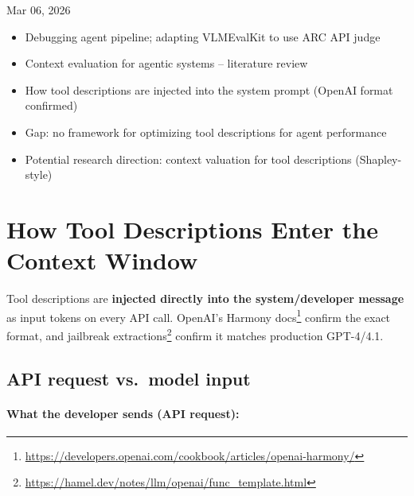 \meetingheader
    {Mar 06, 2026}
    {}
    {}
    {\begin{itemize}
        \item Debugging agent pipeline; adapting VLMEvalKit to use ARC API judge
        \item Context evaluation for agentic systems -- literature review
        \item How tool descriptions are injected into the system prompt (OpenAI format confirmed)
        \item Gap: no framework for optimizing tool descriptions for agent performance
        \item Potential research direction: context valuation for tool descriptions (Shapley-style)
    \end{itemize}}
    {}



\section{How Tool Descriptions Enter the Context Window}

Tool descriptions are \textbf{injected directly into the system/developer message} as input tokens on every API call.
OpenAI's Harmony docs\footnote{\url{https://developers.openai.com/cookbook/articles/openai-harmony/}} confirm the exact format, and jailbreak extractions\footnote{\url{https://hamel.dev/notes/llm/openai/func\_template.html}} confirm it matches production GPT-4/4.1.

\subsection{API request vs.\ model input}

\paragraph{What the developer sends (API request):}

